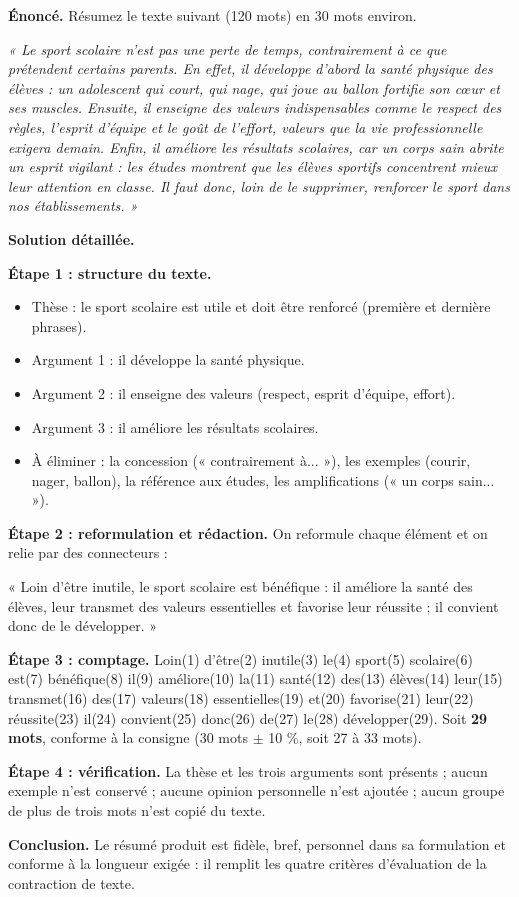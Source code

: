 \documentclass[11pt]{article}
\begin{document}
\begin{exoresolu}
\textbf{Énoncé.} Résumez le texte suivant (120 mots) en 30 mots environ.

\emph{« Le sport scolaire n'est pas une perte de temps, contrairement à ce que prétendent certains parents. En effet, il développe d'abord la santé physique des élèves : un adolescent qui court, qui nage, qui joue au ballon fortifie son cœur et ses muscles. Ensuite, il enseigne des valeurs indispensables comme le respect des règles, l'esprit d'équipe et le goût de l'effort, valeurs que la vie professionnelle exigera demain. Enfin, il améliore les résultats scolaires, car un corps sain abrite un esprit vigilant : les études montrent que les élèves sportifs concentrent mieux leur attention en classe. Il faut donc, loin de le supprimer, renforcer le sport dans nos établissements. »}

\tcblower
\textbf{Solution détaillée.}

\textbf{Étape 1 : structure du texte.}
\begin{itemize}
\item Thèse : le sport scolaire est utile et doit être renforcé (première et dernière phrases).
\item Argument 1 : il développe la santé physique.
\item Argument 2 : il enseigne des valeurs (respect, esprit d'équipe, effort).
\item Argument 3 : il améliore les résultats scolaires.
\item À éliminer : la concession (« contrairement à... »), les exemples (courir, nager, ballon), la référence aux études, les amplifications (« un corps sain... »).
\end{itemize}

\textbf{Étape 2 : reformulation et rédaction.} On reformule chaque élément et on relie par des connecteurs :

« Loin d'être inutile, le sport scolaire est bénéfique : il améliore la santé des élèves, leur transmet des valeurs essentielles et favorise leur réussite ; il convient donc de le développer. »

\textbf{Étape 3 : comptage.}
Loin(1) d'être(2) inutile(3) le(4) sport(5) scolaire(6) est(7) bénéfique(8) il(9) améliore(10) la(11) santé(12) des(13) élèves(14) leur(15) transmet(16) des(17) valeurs(18) essentielles(19) et(20) favorise(21) leur(22) réussite(23) il(24) convient(25) donc(26) de(27) le(28) développer(29).
Soit \textbf{29 mots}, conforme à la consigne (30 mots $\pm$ 10 \%, soit 27 à 33 mots).

\textbf{Étape 4 : vérification.} La thèse et les trois arguments sont présents ; aucun exemple n'est conservé ; aucune opinion personnelle n'est ajoutée ; aucun groupe de plus de trois mots n'est copié du texte.

\textbf{Conclusion.} Le résumé produit est fidèle, bref, personnel dans sa formulation et conforme à la longueur exigée : il remplit les quatre critères d'évaluation de la contraction de texte.
\end{exoresolu}
\end{document}
